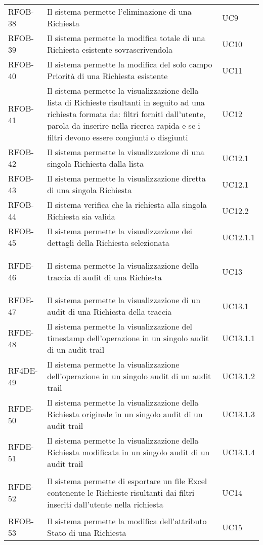 \begin{center}
\begin{longtable}{p{2.0cm}|p{8cm}|p{2.7cm}}
RFOB-38  & Il sistema permette l'eliminazione di una Richiesta & UC9 \\ 
RFOB-39  & Il sistema permette la modifica totale di una Richiesta esistente sovrascrivendola & UC10 \\ 
RFOB-40  & Il sistema permette la modifica del solo campo Priorità di una Richiesta esistente & UC11 \\ 
RFOB-41  & Il sistema permette la visualizzazione della lista di Richieste risultanti in seguito ad una richiesta formata da: filtri forniti dall'utente, parola da inserire nella ricerca rapida e se i filtri devono essere congiunti o disgiunti & UC12 \\ 
RFOB-42  & Il sistema permette la visualizzazione di una singola Richiesta dalla lista & UC12.1 \\ 
RFOB-43  & Il sistema permette la visualizzazione diretta di una singola Richiesta & UC12.1 \\ 
RFOB-44  & Il sistema verifica che la richiesta alla singola Richiesta sia valida & UC12.2 \\ 
RFOB-45  & Il sistema permette la visualizzazione dei dettagli della Richiesta selezionata & UC12.1.1 \\ 



\hypertarget{rf46}{RFDE-46}  & Il sistema permette la visualizzazione della traccia di audit di una Richiesta & UC13 \\ 
RFDE-47  & Il sistema permette la visualizzazione di un audit di una Richiesta della traccia & UC13.1 \\ 
RFDE-48  & Il sistema permette la visualizzazione del timestamp dell'operazione in un singolo audit di un audit trail & UC13.1.1 \\ 
RF4DE-49  & Il sistema permette la visualizzazione dell'operazione in un singolo audit di un audit trail & UC13.1.2 \\ 
RFDE-50  & Il sistema permette la visualizzazione della Richiesta originale in un singolo audit di un audit trail & UC13.1.3 \\ 
RFDE-51  & Il sistema permette la visualizzazione della Richiesta modificata in un singolo audit di un audit trail & UC13.1.4 \\ 



\hypertarget{rf52}{RFDE-52}  & Il sistema permette di esportare un file Excel contenente le Richieste risultanti dai filtri inseriti dall'utente nella richiesta & UC14 \\ 
RFOB-53  & Il sistema permette la modifica dell'attributo Stato di una Richiesta & UC15 \\ 


\end{longtable}
\end{center}
